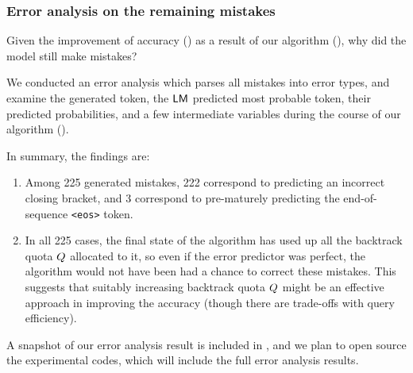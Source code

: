 






\clearpage
\subsubsection{Error analysis on the remaining mistakes}
\label{sec:experiments:synthetic:error_analysis}

Given the improvement of accuracy () as a result of our algorithm \algoName (),
why did the model still make mistakes?

We conducted an error analysis which parses all mistakes into error types, 
and examine the generated token, the $\mathsf{LM}$ predicted most probable token, their predicted probabilities, and a few intermediate variables during the course of our algorithm \algoName ().

In summary, the findings are:
\begin{enumerate}
    \item Among 225 generated mistakes, 222 correspond to predicting an incorrect closing bracket, and 3 correspond to pre-maturely predicting the end-of-sequence \texttt{<eos>} token.
    \item In all 225 cases, the final state of the algorithm has used up all the backtrack quota $Q$ allocated to it, so even if the error predictor was perfect, the algorithm would not have been had a chance to correct these mistakes. This suggests that suitably increasing backtrack quota $Q$ might be an effective approach in improving the accuracy (though there are trade-offs with query efficiency).
\end{enumerate}

A snapshot of our error analysis result is included in ,
and we plan to open source the experimental codes, 
which will include the full error analysis results.



